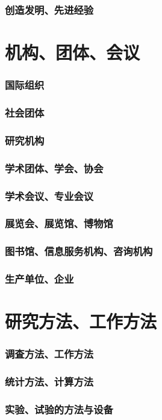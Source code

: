\documentclass[UTF8]{../ApplicationUniverse}
\begin{document}
    \subsubsection{创造发明、先进经验}
\section{机构、团体、会议}
    \subsubsection{国际组织}
    \subsubsection{社会团体}
    \subsubsection{研究机构}
    \subsubsection{学术团体、学会、协会}
    \subsubsection{学术会议、专业会议}
    \subsubsection{展览会、展览馆、博物馆}
    \subsubsection{图书馆、信息服务机构、咨询机构}
    \subsubsection{生产单位、企业}
\section{研究方法、工作方法}
    \subsubsection{调査方法、工作方法}
    \subsubsection{统计方法、计算方法}
    \subsubsection{实验、试验的方法与设备}
\end{document}
